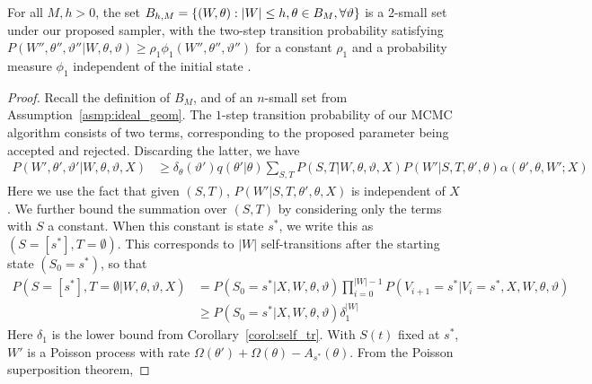 \begin{lemma}
  For all $M,h > 0$, the set $B_{h,M} =
\left\lbrace (W, \theta) : |W| \leq h, \theta \in B_M, \forall \vartheta
\right\rbrace$ is a 2-small set under our proposed sampler, with the 
two-step transition probability satisfying 
$P(W'', \theta'',\vartheta'' | W, \theta, \vartheta) \ge \rho_1 
\phi_1(W{''}, \theta'',\vartheta'') $ for a constant $\rho_1$ and a 
probability measure $\phi_1$ independent of the initial state .
\label{lem:small_set}
\end{lemma}
\begin{proof} Recall the definition of $B_M$, and of an $n$-small set from 
  Assumption~\ref{asmp:ideal_geom}. The $1$-step transition probability of our MCMC algorithm
  consists of two terms, corresponding to the proposed parameter being
  accepted and rejected. Discarding the latter, we have %
\begin{align*}
  P(W',\theta',\vartheta'|W,\theta,\vartheta,X)&\geq
  \delta_\theta(\vartheta') q(\theta'|\theta)
 \sum_{S,T}  P(S,T | W, \theta, \vartheta, X) 
             P(W'| S, T, \theta', \theta)
             \alpha(\theta', \theta, W';X)
\end{align*}
Here we use the fact that given $(S,T)$,
$P(W'|S,T,\theta',\theta,X)$ is independent of  $X$.
We further bound the summation over $(S,T)$ by considering only the terms
with $S$ a constant. When this constant is  state $s^*$, we write this as 
$(S=[s^*], T= \emptyset)$. This corresponds to $|W|$ self-transitions 
after the starting state $(S_0=s^*)$, so that
\begin{align*}
P(S=[s^*], T = \emptyset | W, \theta, \vartheta, X) & =
P(S_0=s^*|X,W, \theta, \vartheta)\prod_{i = 0}^{|W| - 1} 
P(V_{i + 1} = s^* | V_i = s^*,X,W,\theta,\vartheta) \\ 
& \geq P(S_0=s^*|X,W, \theta, \vartheta)\delta_1^{|W|} %
\end{align*}
Here $\delta_1$ is the lower bound from Corollary~\ref{corol:self_tr}.
With $S(t)$ fixed at $s^*$, $W'$ is a Poisson process with rate
$\Omega(\theta') + \Omega(\theta) - A_{s^*}(\theta)$.
From the %
Poisson superposition theorem,

\end{proof}
